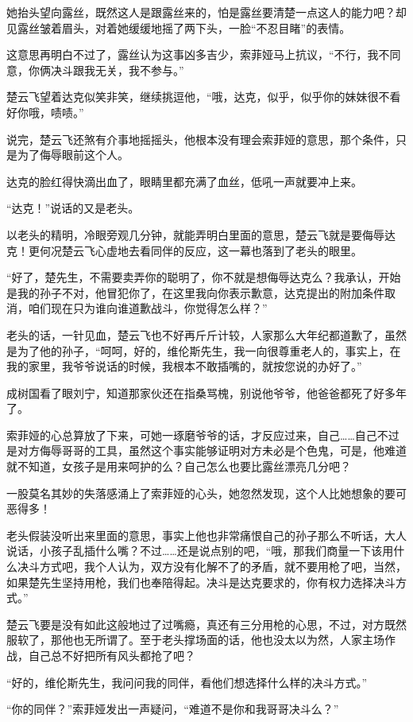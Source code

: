 她抬头望向露丝，既然这人是跟露丝来的，怕是露丝要清楚一点这人的能力吧？却见露丝皱着眉头，对着她缓缓地摇了两下头，一脸“不忍目睹”的表情。

这意思再明白不过了，露丝认为这事凶多吉少，索菲娅马上抗议，“不行，我不同意，你俩决斗跟我无关，我不参与。”

楚云飞望着达克似笑非笑，继续挑逗他，“哦，达克，似乎，似乎你的妹妹很不看好你哦，啧啧。”

说完，楚云飞还煞有介事地摇摇头，他根本没有理会索菲娅的意思，那个条件，只是为了侮辱眼前这个人。

达克的脸红得快滴出血了，眼睛里都充满了血丝，低吼一声就要冲上来。

“达克！”说话的又是老头。

以老头的精明，冷眼旁观几分钟，就能弄明白里面的意思，楚云飞就是要侮辱达克！更何况楚云飞心虚地去看同伴的反应，这一幕也落到了老头的眼里。

“好了，楚先生，不需要卖弄你的聪明了，你不就是想侮辱达克么？我承认，开始是我的孙子不对，他冒犯你了，在这里我向你表示歉意，达克提出的附加条件取消，咱们现在只为谁向谁道歉战斗，你觉得怎么样？”

老头的话，一针见血，楚云飞也不好再斤斤计较，人家那么大年纪都道歉了，虽然是为了他的孙子，“呵呵，好的，维伦斯先生，我一向很尊重老人的，事实上，在我的家里，我爷爷说话的时候，我根本不敢插嘴的，就按您说的办好了。”

成树国看了眼刘宁，知道那家伙还在指桑骂槐，别说他爷爷，他爸爸都死了好多年了。

索菲娅的心总算放了下来，可她一琢磨爷爷的话，才反应过来，自己……自己不过是对方侮辱哥哥的工具，虽然这个事实能够证明对方未必是个色鬼，可是，他难道就不知道，女孩子是用来呵护的么？自己怎么也要比露丝漂亮几分吧？

一股莫名其妙的失落感涌上了索菲娅的心头，她忽然发现，这个人比她想象的要可恶得多！

老头假装没听出来里面的意思，事实上他也非常痛恨自己的孙子那么不听话，大人说话，小孩子乱插什么嘴？不过……还是说点别的吧，“哦，那我们商量一下该用什么决斗方式吧，我个人认为，双方没有化解不了的矛盾，就不要用枪了吧，当然，如果楚先生坚持用枪，我们也奉陪得起。决斗是达克要求的，你有权力选择决斗方式。”

楚云飞要是没有如此这般地过了过嘴瘾，真还有三分用枪的心思，不过，对方既然服软了，那他也无所谓了。至于老头撑场面的话，他也没太以为然，人家主场作战，自己总不好把所有风头都抢了吧？

“好的，维伦斯先生，我问问我的同伴，看他们想选择什么样的决斗方式。”

“你的同伴？”索菲娅发出一声疑问，“难道不是你和我哥哥决斗么？”

